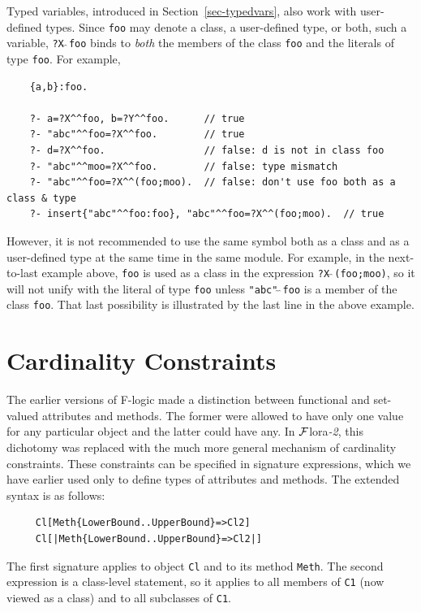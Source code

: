 \documentclass[11pt]{article}
\newcommand{\FLORA}{{\mbox{\sc ${\cal F}${lora}\rm\emph{-2}}}\xspace}
\newcommand{\FLSYSTEM}{\FLORA}
\begin{document}
Typed variables, introduced in Section~\ref{sec-typedvars}, also work with
user-defined types. Since \texttt{foo} may denote a class, a user-defined
type, or both, such a variable, \texttt{?X$\hat{~}\hat{~}$foo} binds to
\emph{both} the members of the class \texttt{foo} and the literals of type
\texttt{foo}. For example,
\begin{verbatim}
    {a,b}:foo.

    ?- a=?X^^foo, b=?Y^^foo.      // true
    ?- "abc"^^foo=?X^^foo.        // true
    ?- d=?X^^foo.                 // false: d is not in class foo
    ?- "abc"^^moo=?X^^foo.        // false: type mismatch
    ?- "abc"^^foo=?X^^(foo;moo).  // false: don't use foo both as a class & type
    ?- insert{"abc"^^foo:foo}, "abc"^^foo=?X^^(foo;moo).  // true
\end{verbatim}
However, it is not recommended to use the same symbol both as a class and
as a user-defined type at the same time in the same module. For example, in
the next-to-last example above, \texttt{foo} is used as a class in the
expression \texttt{?X$\hat{~}\hat{~}$(foo;moo)}, so it will not unify with the literal of type
\texttt{foo} unless \texttt{"abc"$\hat{~}\hat{~}$foo} is a member of the
class \texttt{foo}. That last possibility is illustrated by the last line
in the above example.  


\ifdef{\isfloraman}{}
{
  
}


\section{Cardinality Constraints}\label{sec-card-in-signatures}

The earlier versions of F-logic made a distinction between functional and
set-valued attributes and methods. The former were allowed to have only one
value for any particular object and the latter could have any. In \FLSYSTEM,
this dichotomy was replaced with the much more general mechanism of
cardinality constraints. These constraints can be specified in signature
expressions, which we have earlier used only to define types of attributes
and methods. The extended syntax is as follows:
\begin{verbatim}
     Cl[Meth{LowerBound..UpperBound}=>Cl2]
     Cl[|Meth{LowerBound..UpperBound}=>Cl2|]
\end{verbatim}
The first signature applies to object {\tt Cl} and to its 
method {\tt Meth}. The second expression is a class-level statement, so it
applies to all members of \texttt{C1} (now viewed as a class) and to all
subclasses of \texttt{C1}.  
\end{document}
